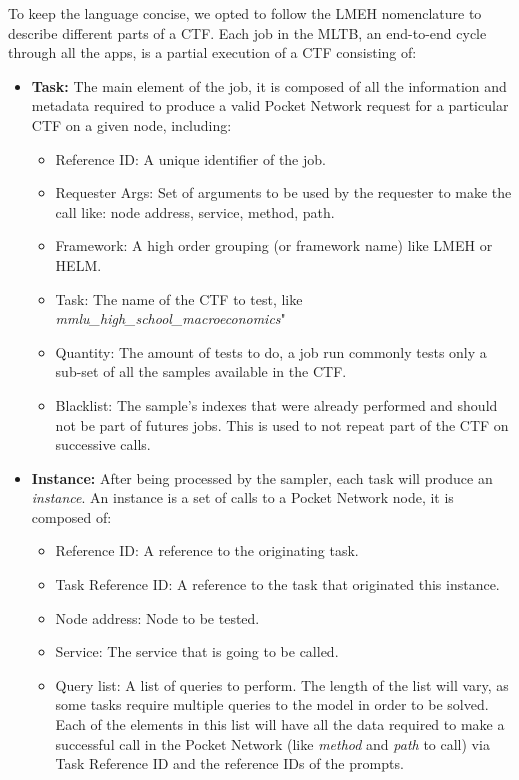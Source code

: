 To keep the language concise, we opted to follow the \gls{LMEH} nomenclature to describe different parts of a \gls{CTF}. Each job in the \gls{MLTB}, an end-to-end cycle through all the apps, is a partial execution of a \gls{CTF} consisting of:
\begin{itemize}
    \item \textbf{Task:} The main element of the job, it is composed of all the information and metadata required to produce a valid Pocket Network request for a particular \gls{CTF} on a given node, including:
    \begin{itemize}
        \item Reference ID: A unique identifier of the job.
        \item Requester Args: Set of arguments to be used by the requester to make the call like: node address, service, method, path.
        \item Framework: A high order grouping (or framework name) like \gls{LMEH} or \gls{HELM}.
        \item Task: The name of the \gls{CTF} to test, like \emph{mmlu\_high\_school\_macroeconomics}"
        \item Quantity: The amount of tests to do, a job run commonly tests only a sub-set of all the samples available in the \gls{CTF}.
        \item Blacklist: The sample's indexes that were already performed and should not be part of futures jobs. This is used to not repeat part of the \gls{CTF} on successive calls.
    \end{itemize}
    \item \textbf{Instance:} After being processed by the sampler, each task will produce an \emph{instance}. An instance is a set of calls to a Pocket Network node, it is composed of:
    \begin{itemize}
        \item Reference ID: A reference to the originating task.
        \item Task Reference ID: A reference to the task that originated this instance.
        \item Node address: Node to be tested.
        \item Service: The service that is going to be called.
        \item Query list: A list of queries to perform. The length of the list will vary, as some tasks require multiple queries to the model in order to be solved. Each of the elements in this list will have all the data required to make a successful call in the Pocket Network (like \emph{method} and \emph{path} to call) via Task Reference ID and the reference IDs of the prompts.

\end{itemize}
\end{itemize}
